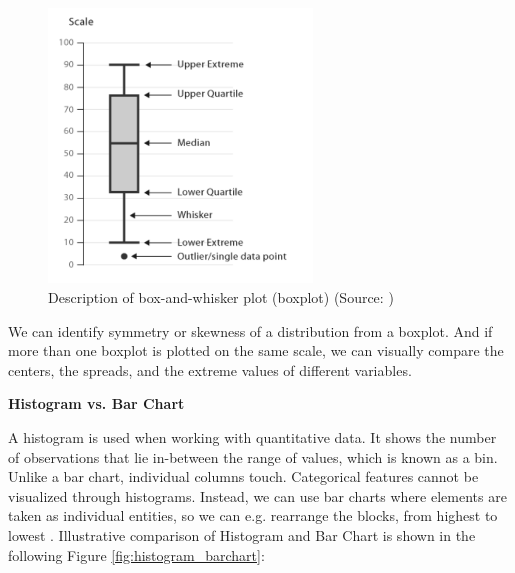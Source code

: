 \documentclass[a4paper,10pt,twoside]{article}
\begin{document}
\vspace{0.3cm}
\begin{figure}[hbt!]
\begin{center}
\includegraphics[width=7cm]{../pictures/boxplot.png}
\caption[Description of box-and-whisker plot (boxplot)]{Description of box-and-whisker plot (boxplot) (Source: \cite{heroku})}
\label{fig:boxplot}
\end{center}
\end{figure}

\noindent We can identify symmetry or skewness of a distribution from
a boxplot. And if more than one boxplot is plotted on the same scale,
we can visually compare the centers, the spreads, and the extreme
values of different variables.

\bigskip
\noindent \textbf {Histogram vs. Bar Chart}

\noindent A histogram is used when working with quantitative data. It
shows the number of observations that lie in-between the range of
values, which is known as a bin. Unlike a bar chart, individual
columns touch. Categorical features cannot be visualized through
histograms. Instead, we can use bar charts where elements are taken as
individual entities, so we can e.g. rearrange the blocks, from highest
to lowest \cite{OnlineMathLearning}. Illustrative comparison of
Histogram and Bar Chart is shown in the following Figure
\ref{fig:histogram_barchart}:
\end{document}
